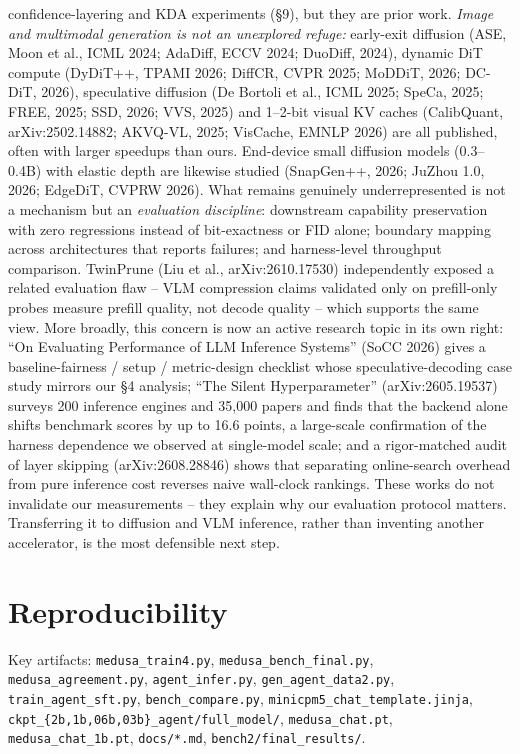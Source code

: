 \documentclass[11pt,a4paper]{article}
\begin{document}
\begin{itemize}[leftmargin=*]
        confidence-layering and KDA experiments (\S9), but they are prior work.
        \emph{Image and multimodal generation is not an unexplored refuge:} early-exit diffusion
        (ASE, Moon et al., ICML 2024; AdaDiff, ECCV 2024; DuoDiff, 2024), dynamic DiT compute
        (DyDiT++, TPAMI 2026; DiffCR, CVPR 2025; MoDDiT, 2026; DC-DiT, 2026), speculative
        diffusion (De Bortoli et al., ICML 2025; SpeCa, 2025; FREE, 2025; SSD, 2026; VVS, 2025)
        and 1--2-bit visual KV caches (CalibQuant, arXiv:2502.14882; AKVQ-VL, 2025; VisCache,
        EMNLP 2026) are all published, often with larger speedups than ours. End-device small
        diffusion models (0.3--0.4B) with elastic depth are likewise studied (SnapGen++, 2026;
        JuZhou 1.0, 2026; EdgeDiT, CVPRW 2026). What remains genuinely underrepresented is not a
        mechanism but an \emph{evaluation discipline}: downstream capability preservation with
        zero regressions instead of bit-exactness or FID alone; boundary mapping across
        architectures that reports failures; and harness-level throughput comparison. TwinPrune
        (Liu et al., arXiv:2610.17530) independently exposed a related evaluation flaw -- VLM
        compression claims validated only on prefill-only probes measure prefill quality, not
        decode quality -- which supports the same view. More broadly, this concern is now an
        active research topic in its own right: ``On Evaluating Performance of LLM Inference
        Systems'' (SoCC 2026) gives a baseline-fairness / setup / metric-design checklist whose
        speculative-decoding case study mirrors our \S4 analysis; ``The Silent Hyperparameter''
        (arXiv:2605.19537) surveys 200 inference engines and 35,000 papers and finds that the
        backend alone shifts benchmark scores by up to 16.6 points, a large-scale confirmation
        of the harness dependence we observed at single-model scale; and a rigor-matched audit
        of layer skipping (arXiv:2608.28846) shows that separating online-search overhead from
        pure inference cost reverses naive wall-clock rankings. These works do not invalidate
        our measurements -- they explain why our evaluation protocol matters. Transferring it to
        diffusion and VLM inference, rather than inventing another accelerator, is the most
        defensible next step.
\end{itemize}

\appendix
\section{Reproducibility}
Key artifacts: \texttt{medusa\_train4.py}, \texttt{medusa\_bench\_final.py},
\texttt{medusa\_agreement.py}, \texttt{agent\_infer.py}, \texttt{gen\_agent\_data2.py},
\texttt{train\_agent\_sft.py}, \texttt{bench\_compare.py},
\texttt{minicpm5\_chat\_template.jinja}, \texttt{ckpt\_\{2b,1b,06b,03b\}\_agent/full\_model/},
\texttt{medusa\_chat.pt}, \texttt{medusa\_chat\_1b.pt}, \texttt{docs/*.md},
\texttt{bench2/final\_results/}.
\end{document}
